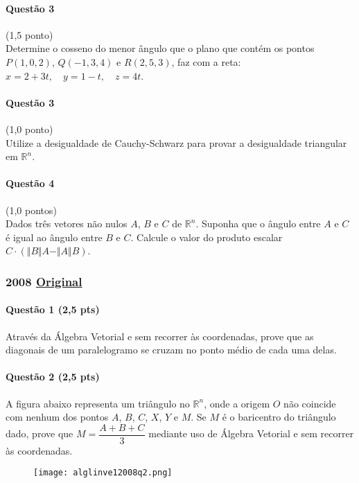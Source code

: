 \documentclass[12pt,a4paper]{article}
\newcommand{\R}{\mathbb{R}}
\newcommand{\norm}[1]{\Vert #1 \Vert}
\newcommand{\original}[1]{\tiny \href{#1}{Original} \normalsize}
\begin{document}
\paragraph{Questão 3} (1,5 ponto)\\
Determine o cosseno do menor ângulo que o plano que contém os pontos $P(1,0,2)$, $Q(-1,3,4)$ e $R(2,5,3)$, faz com a reta: $x=2+3t,\quad y=1-t,\quad z=4t$.

\paragraph{Questão 3} (1,0 ponto)\\
Utilize a desigualdade de Cauchy-Schwarz para provar a desigualdade triangular em $\R^n$.

\paragraph{Questão 4} (1,0 pontos)\\
Dados três vetores não nulos $A$, $B$ e $C$ de $\R^n$. Suponha que o ângulo entre $A$ e $C$ é igual ao ângulo entre $B$ e $C$. Calcule o valor do produto escalar $C\cdot (\norm{B}A- \norm{A}B)$.

\newpage

\subsubsection{2008 \original{https://drive.google.com/file/d/1eYsX_2o8P21uQGp9MoAtEEim-2_Syw0v/view?usp=sharing}}

\paragraph{Questão 1 (2,5 pts)} Através da Álgebra Vetorial e sem recorrer às coordenadas, prove que as diagonais de um paralelogramo se cruzam no ponto médio de cada uma delas.

\paragraph{Questão 2 (2,5 pts)} A figura abaixo representa um triângulo no $\R^n$, onde a origem $O$ não coincide com nenhum dos pontos $A$, $B$, $C$, $X$, $Y$ e $M$. Se $M$ é o baricentro do triângulo dado, prove que $M=\dfrac{A+B+C}{3}$ mediante uso de Álgebra Vetorial e sem recorrer às coordenadas.

\begin{figure}[h]
\centering
\texttt{[image: alglinve12008q2.png]}
\end{figure}
\end{document}
